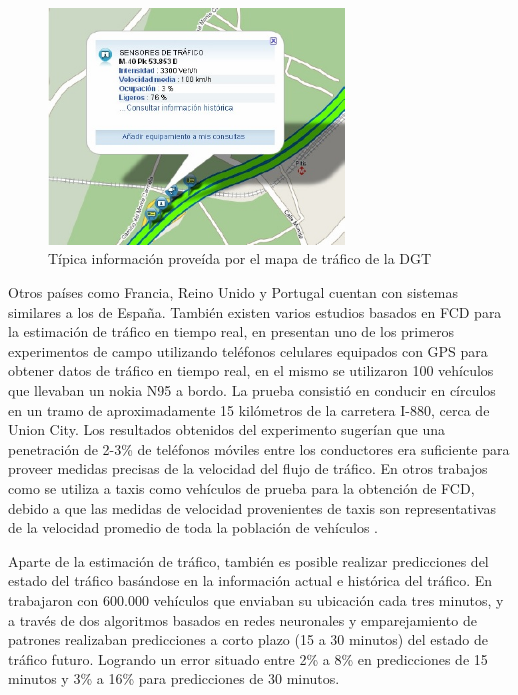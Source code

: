 \begin{figure}[h]
	\centering
	\includegraphics[width=0.7\textwidth]{capitulos/5/figuras/figura2.jpg}
	\caption{\label{fig:mapaTrafico} Típica información proveída por el mapa de tráfico de la DGT}	
\end{figure}

Otros países como Francia, Reino Unido y Portugal cuentan con sistemas similares a los de España. También existen varios estudios basados en FCD para la estimación de tráfico en tiempo real, en \cite{herrera2010evaluation} presentan uno de los primeros experimentos de campo utilizando teléfonos celulares equipados con GPS para obtener datos de tráfico en tiempo real, en el mismo se utilizaron 100 vehículos que llevaban un nokia N95 a bordo. La prueba consistió en conducir en círculos en un tramo de aproximadamente 15 kilómetros de la carretera I-880, cerca de Union City. Los resultados obtenidos del experimento sugerían que una penetración de 2-3\% de teléfonos móviles entre los conductores era suficiente para proveer medidas precisas de la velocidad del flujo de tráfico. En otros trabajos como \cite{reinthaler2007evaluation} se utiliza a taxis como vehículos de prueba para la obtención de FCD, debido a que las medidas de velocidad provenientes de taxis son representativas de la velocidad promedio de toda la población de vehículos \cite{linauer2004fleet}. 

Aparte de la estimación de tráfico, también es posible realizar predicciones del estado del tráfico basándose en la información actual e histórica del tráfico. En \cite{de2008traffic} trabajaron con 600.000 vehículos que enviaban su ubicación cada tres minutos, y a través de dos algoritmos basados en redes neuronales y emparejamiento de patrones realizaban predicciones a corto plazo (15 a 30 minutos) del estado de tráfico futuro. Logrando un error situado entre 2\% a 8\% en predicciones de 15 minutos y 3\% a 16\% para predicciones de 30 minutos.